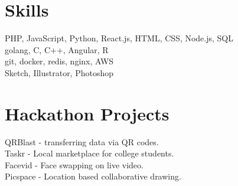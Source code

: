 \documentclass[]{resume-openfont}
\begin{document}
\begin{minipage}[t]{0.26\textwidth}

\section{\textcolor{primary3}{Skills}}
PHP, JavaScript, Python, React.js, HTML, CSS, Node.js, SQL\\
\sectionsep \sectionsep
{}
golang, C, C++, Angular, R\\
\sectionsep \sectionsep
{}
git, docker, redis, nginx, AWS\\
\sectionsep \sectionsep
{}
Sketch, Illustrator, Photoshop\\
\sectionsep


\section{\textcolor{primary4}{Hackathon Projects}}
  QRBlast - transferring data via QR codes.\\
  \sectionsep \sectionsep
{}
  Taskr - Local marketplace for college students.\\
\sectionsep \sectionsep
{}
   Facevid - Face swapping on live video.\\
\sectionsep \sectionsep
{}
   Picspace - Location based collaborative drawing. \\
\sectionsep


\end{minipage}
\end{document}
